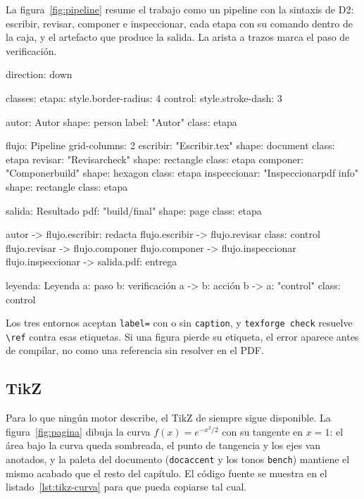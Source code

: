 La figura~\ref{fig:pipeline} resume el trabajo como un pipeline con la
sintaxis de D2: escribir, revisar, componer e inspeccionar, cada etapa con
su comando dentro de la caja, y el artefacto que produce la salida. La
arista a trazos marca el paso de verificación.

\begin{d2}[width=1.0\linewidth, caption={Flujo de trabajo, de la escritura a la inspección}, label={fig:pipeline}, pos=H]
  direction: down

  classes: {
    etapa: {
      style.border-radius: 4
    }
    control: {
      style.stroke-dash: 3
    }
  }

  autor: Autor {
    shape: person
    label: "Autor"
    class: etapa
  }

  flujo: Pipeline {
    grid-columns: 2
    escribir: "Escribir\nfuente .tex" {
      shape: document
      class: etapa
    }
    revisar: "Revisar\ntexforge check" {
      shape: rectangle
      class: etapa
    }
    componer: "Componer\ntexforge build" {
      shape: hexagon
      class: etapa
    }
    inspeccionar: "Inspeccionar\ntexforge pdf info" {
      shape: rectangle
      class: etapa
    }
  }

  salida: Resultado {
    pdf: "build/\nPDF final" {
      shape: page
      class: etapa
    }
  }

  autor -> flujo.escribir: redacta
  flujo.escribir -> flujo.revisar {
    class: control
  }
  flujo.revisar -> flujo.componer
  flujo.componer -> flujo.inspeccionar
  flujo.inspeccionar -> salida.pdf: entrega

  leyenda: Leyenda {
    a: paso
    b: verificación
    a -> b: acción
    b -> a: "control" {
      class: control
    }
  }
\end{d2}
\FloatBarrier

\begin{notebox}
  Los tres entornos aceptan \texttt{label=} con o sin \texttt{caption}, y
  \texttt{texforge check} resuelve \texttt{\textbackslash ref} contra esas
  etiquetas. Si una figura pierde su etiqueta, el error aparece antes de
  compilar, no como una referencia sin resolver en el PDF.
\end{notebox}

\subsection{TikZ}

Para lo que ningún motor describe, el TikZ de siempre sigue disponible. La
figura~\ref{fig:pagina} dibuja la curva $f(x)=e^{-x^{2}/2}$ con su tangente
en $x=1$: el área bajo la curva queda sombreada, el punto de tangencia y los
ejes van anotados, y la paleta del documento (\texttt{docaccent} y los tonos
\texttt{bench}) mantiene el mismo acabado que el resto del capítulo. El
código fuente se muestra en el listado~\ref{lst:tikz-curva} para que pueda
copiarse tal cual.

